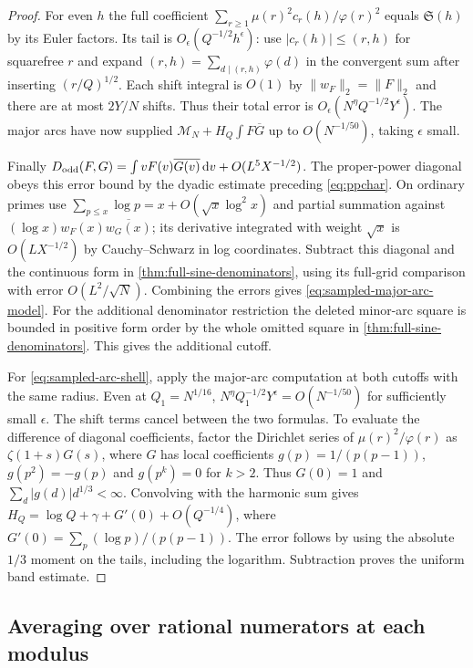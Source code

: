 \documentclass[11pt,a4paper]{article}
\numberwithin{equation}{section}
\newcommand{\SSS}{\mathfrak S}
\newcommand{\ud}{\mathrm d}
\begin{document}
\begin{proof}
For even $h$ the full coefficient
$\sum_{r\ge1}\mu(r)^2c_r(h)/\varphi(r)^2$ equals $\SSS(h)$ by
its Euler factors. Its tail is $O_\epsilon(Q^{-1/2}h^\epsilon)$:
use $|c_r(h)|\le(r,h)$ for squarefree $r$ and expand
$(r,h)=\sum_{d\mid(r,h)}\varphi(d)$ in the convergent sum
after inserting $(r/Q)^{1/2}$. Each shift integral is $O(1)$
by $\|w_F\|_2=\|F\|_2$ and there are at most $2Y/N$ shifts.
Thus their total error is $O_\epsilon(N^\eta Q^{-1/2}Y^\epsilon)$.
The major arcs have now supplied $\mathcal M_N+H_Q\int F\overline G$
up to $O(N^{-1/50})$, taking $\epsilon$ small.

Finally $D_{\rm odd}(F,G)=\int v F(v)\overline{G(v)}\,\ud v+
O(L^5 X^{-1/2})$. The proper-power diagonal obeys this error
bound by the dyadic estimate preceding \eqref{eq:ppchar}. On
ordinary primes use $\sum_{p\le x}\log p=x+O(\sqrt x\log^2 x)$
and partial summation against $(\log x)w_F(x)\overline{w_G(x)}$;
its derivative integrated with weight $\sqrt x$ is
$O(L X^{-1/2})$ by Cauchy--Schwarz in log coordinates.
Subtract this diagonal and the continuous form in
\cref{thm:full-sine-denominators}, using its full-grid comparison
with error $O(L^2/\sqrt N)$. Combining the errors gives
\eqref{eq:sampled-major-arc-model}. For the additional denominator
restriction the deleted minor-arc square is bounded in positive
form order by the whole omitted square in
\cref{thm:full-sine-denominators}. This gives the additional cutoff.

For \eqref{eq:sampled-arc-shell}, apply the major-arc computation
at both cutoffs with the same radius. Even at $Q_1=N^{1/16}$,
$N^\eta Q_1^{-1/2}Y^\epsilon=O(N^{-1/50})$ for sufficiently
small $\epsilon$. The shift terms cancel between the two formulas.
To evaluate the difference of diagonal coefficients, factor the
Dirichlet series of $\mu(r)^2/\varphi(r)$ as $\zeta(1+s)G(s)$,
where $G$ has local coefficients $g(p)=1/(p(p-1))$,
$g(p^2)=-g(p)$ and $g(p^k)=0$ for $k>2$. Thus $G(0)=1$ and
$\sum_d |g(d)|d^{1/3}<\infty$. Convolving with the harmonic
sum gives $H_Q=\log Q+\gamma+G'(0)+O(Q^{-1/4})$, where
$G'(0)=\sum_p(\log p)/(p(p-1))$. The error follows by using the
absolute $1/3$ moment on the tails, including the logarithm.
Subtraction proves the uniform band estimate.
\end{proof}

\subsection{Averaging over rational numerators at each modulus}
\end{document}
